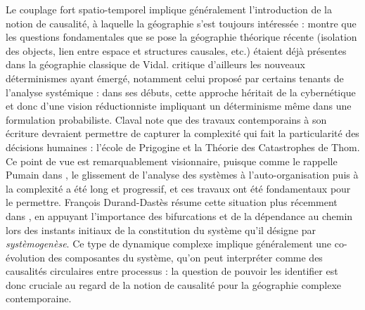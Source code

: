 \documentclass[french]{./sageo}
\begin{document}
Le couplage fort spatio-temporel implique généralement l'introduction de la notion de causalité, à laquelle la géographie s'est toujours intéressée : \cite{loi1985etude} montre que les questions fondamentales que se pose la géographie théorique récente (isolation des objects, lien entre espace et structures causales, etc.) étaient déjà présentes dans la géographie classique de Vidal. \cite{claval1985causalite} critique d'ailleurs les nouveaux déterminismes ayant émergé, notamment celui proposé par certains tenants de l'analyse systémique : dans ses débuts, cette approche héritait de la cybernétique et donc d'une vision réductionniste impliquant un déterminisme même dans une formulation probabiliste. Claval note que des travaux contemporains à son écriture devraient permettre de capturer la complexité qui fait la particularité des décisions humaines : l'école de Prigogine et la Théorie des Catastrophes de Thom. Ce point de vue est remarquablement visionnaire, puisque comme le rappelle Pumain dans \cite{pumain2003approche}, le glissement de l'analyse des systèmes à l'auto-organisation puis à la complexité a été long et progressif, et ces travaux ont été fondamentaux pour le permettre. François Durand-Dastès résume cette situation plus récemment dans \cite{durand2003geographes}, en appuyant l'importance des bifurcations et de la dépendance au chemin lors des instants initiaux de la constitution du système qu'il désigne par \emph{systèmogenèse}. Ce type de dynamique complexe implique généralement une co-évolution des composantes du système, qu'on peut interpréter comme des causalités circulaires entre processus : la question de pouvoir les identifier est donc cruciale au regard de la notion de causalité pour la géographie complexe contemporaine.
\end{document}
